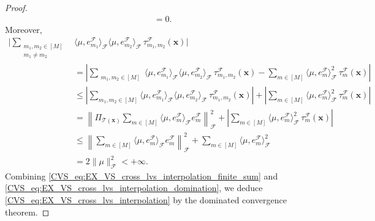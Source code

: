 \documentclass[twoside,11pt]{book}
\numberwithin{theorem}{chapter}
\numberwithin{definition}{chapter}
\numberwithin{proposition}{chapter}
\numberwithin{corollary}{chapter}
\numberwithin{example}{chapter}
\numberwithin{lemma}{chapter}
\numberwithin{assumption}{chapter}
\numberwithin{equation}{chapter}
\numberwithin{figure}{chapter}
\DeclareMathOperator{\F}{\mathcal{F}}
\begin{document}
\begin{proof}
\begin{align}
& = 0.
\label{CVS_eq:EX_VS_cross_lvs_interpolation_finite_sum}
\end{align}
Moreover,
\begin{align}
\Bigg\vert\sum\limits_{\substack{m_{1},m_{2} \in [M] \\ m_{1} \neq m_{2}}}  &\langle \mu, e_{m_{1}}^{\F} \rangle_{\F} \langle \mu, e_{m_{2}}^{\F} \rangle_{\F} \,\tau_{m_{1},m_{2}}^{\F}(\bm{x})\Bigg\vert\nonumber \\
& = \left|\sum\limits_{\substack{m_{1},m_{2} \in [M]}}  \langle \mu, e_{m_{1}}^{\F} \rangle_{\F} \langle \mu, e_{m_{2}}^{\F} \rangle_{\F} \,\tau_{m_{1},m_{2}}^{\F}(\bm{x}) - \sum\limits_{m \in [M]} \langle \mu, e_{m}^{\F} \rangle_{\F}^{2} \,\tau_{m}^{\F}(\bm{x})\right|  \nonumber\\
 & \leq \left|\sum\limits_{m_{1},m_{2} \in [M]}  \langle \mu, e_{m_{1}}^{\F} \rangle_{\F} \langle \mu, e_{m_{2}}^{\F} \rangle_{\F} \,\tau_{m_{1},m_{2}}^{\F}(\bm{x})\right|
 +  \left|\sum\limits_{m \in [M]} \langle \mu, e_{m}^{\F} \rangle_{\F}^{2} \,\tau_{m}^{\F}(\bm{x})\right| \nonumber\\
& = \left\| \Pi_{\mathcal{T}(\bm{x})} \sum\limits_{m \in [M]} \langle \mu, e_{m}^{\F} \rangle_{\F} e_{m}^{\F}\right\|_{\F}^{2}  +  \left|\sum\limits_{m \in [M]} \langle \mu, e_{m}^{\F} \rangle_{\F}^{2} \,\tau_{m}^{\F}(\bm{x})\right| \nonumber\\
& \leq \left\|\sum\limits_{m \in [M]} \langle \mu, e_{m}^{\F} \rangle_{\F} e_{m}^{\F}\right\|_{\F}^{2}  +  \sum\limits_{m \in [M]} \langle \mu, e_{m}^{\F} \rangle_{\F}^{2} \nonumber \\
& = 2 \|\mu\|_{\F}^{2} < +\infty.
\label{CVS_eq:EX_VS_cross_lvs_interpolation_domination}
\end{align}
Combining \eqref{CVS_eq:EX_VS_cross_lvs_interpolation_finite_sum} and \eqref{CVS_eq:EX_VS_cross_lvs_interpolation_domination}, we deduce \eqref{CVS_eq:EX_VS_cross_lvs_interpolation} by the dominated convergence theorem.


\end{proof}
\end{document}

